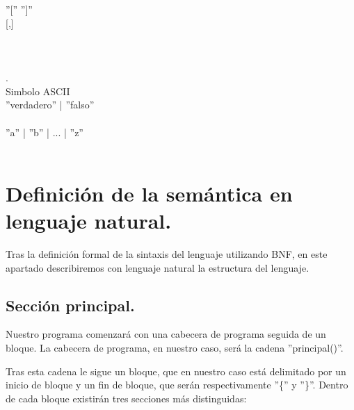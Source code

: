 \documentclass[12pt, spanish]{article}
\begin{document}
\begin{bnf*}
    \\
    \\
    {''[''  '']''}\\
    { [,] }\\
    \bnfmore{| \bnfsp \epsilon}\\
    { }\\
    \\
		{.}\\
        {Simbolo ASCII}\\
		{ ''verdadero'' | ''falso'' }\\
		{}\\
		{''a'' \bnfsp | \bnfsp ''b'' \bnfsp | \bnfsp ... \bnfsp | \bnfsp ''z''}\\
		\\
\end{bnf*}


\section{Definición de la semántica en lenguaje natural.}

Tras la definición formal de la sintaxis del lenguaje utilizando BNF, en este apartado describiremos con lenguaje natural la estructura del lenguaje.


\subsection{Sección principal.}

Nuestro programa comenzará con una cabecera de programa seguida de un bloque. La cabecera de programa, en nuestro caso, será la cadena ''principal()''.

Tras esta cadena le sigue un bloque, que en nuestro caso está delimitado por un inicio de bloque y un fin de bloque, que serán respectivamente ''\{'' y ''\}''. Dentro de cada bloque existirán tres secciones más distinguidas:
\end{document}
